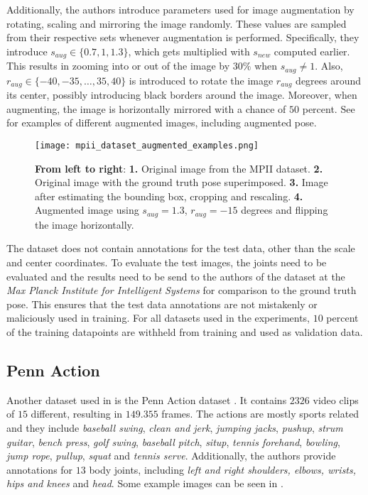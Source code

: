 Additionally, the authors introduce parameters used for image augmentation by rotating, scaling and mirroring the image randomly.
These values are sampled from their respective sets whenever augmentation is performed.
Specifically, they introduce $s_{aug} \in \{0.7, 1, 1.3\}$, which gets multiplied with $s_{new}$ computed earlier.
This results in zooming into or out of the image by $30\%$ when $s_{aug} \not= 1$.
Also, $r_{aug} \in \{-40, -35, \dots, 35, 40\}$ is introduced to rotate the image $r_{aug}$ degrees around its center, possibly introducing black borders around the image.
Moreover, when augmenting, the image is horizontally mirrored with a chance of $50$ percent.
See  for examples of different augmented images, including augmented pose.

\begin{figure}[htb!]
    \centering
    \texttt{[image: mpii\_dataset\_augmented\_examples.png]}
    \caption{\textbf{From left to right}: \textbf{1.} Original image from the MPII dataset. \textbf{2.} Original image with the ground truth pose superimposed. \textbf{3.} Image after estimating the bounding box, cropping and rescaling. \textbf{4.} Augmented image using $s_{aug} = 1.3$, $r_{aug} = -15$ degrees and flipping the image horizontally.}
    \label{fig:mpii_example_augmentation}
\end{figure}


The dataset does not contain annotations for the test data, other than the scale and center coordinates.
To evaluate the test images, the joints need to be evaluated and the results need to be send to the authors of the dataset at the \textit{Max Planck Institute for Intelligent Systems} for comparison to the ground truth pose.
This ensures that the test data annotations are not mistakenly or maliciously used in training.
For all datasets used in the experiments, $10$ percent of the training datapoints are withheld from training and used as validation data.

\subsection{Penn Action}
\label{sec:exp-penn}

Another dataset used in \cite{luvizon_2d/3d_2018} is the Penn Action dataset \cite{zhang_actemes_2013}.
It contains $2326$ video clips of $15$ different, resulting in $149.355$ frames.
The actions are mostly sports related and they include \textit{baseball swing}, \textit{clean and jerk}, \textit{jumping jacks}, \textit{pushup}, \textit{strum guitar}, \textit{bench press}, \textit{golf swing}, \textit{baseball pitch}, \textit{situp}, \textit{tennis forehand}, \textit{bowling}, \textit{jump rope}, \textit{pullup}, \textit{squat} and \textit{tennis serve}.
Additionally, the authors provide annotations for $13$ body joints,
including \textit{left and right shoulders, elbows, wrists, hips and knees} and \textit{head}.
Some example images can be seen in .

